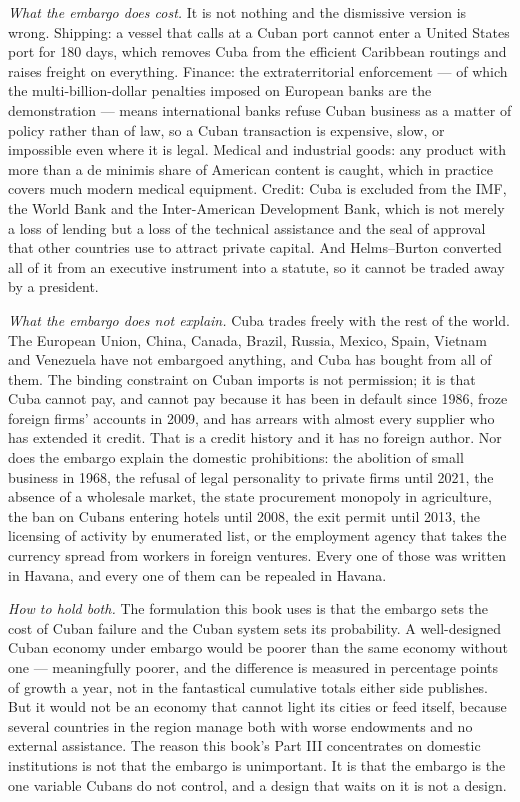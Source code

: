 \emph{What the embargo does cost.} It is not nothing and the dismissive version
is wrong. Shipping: a vessel that calls at a Cuban port cannot enter a United
States port for 180 days, which removes Cuba from the efficient Caribbean
routings and raises freight on everything. Finance: the extraterritorial
enforcement --- of which the multi-billion-dollar penalties imposed on
European banks are the demonstration --- means international banks refuse Cuban
business as a matter of policy rather than of law, so a Cuban transaction is
expensive, slow, or impossible even where it is legal. Medical and industrial
goods: any product with more than a de minimis share of American content is
caught, which in practice covers much modern medical equipment. Credit: Cuba is
excluded from the IMF, the World Bank and the Inter-American Development Bank,
which is not merely a loss of lending but a loss of the technical assistance and
the seal of approval that other countries use to attract private capital. And
Helms--Burton converted all of it from an executive instrument into a statute,
so it cannot be traded away by a president.

\emph{What the embargo does not explain.} Cuba trades freely with the rest of
the world. The European Union, China, Canada, Brazil, Russia, Mexico, Spain,
Vietnam and Venezuela have not embargoed anything, and Cuba has bought from all
of them. The binding constraint on Cuban imports is not permission; it is that
Cuba cannot pay, and cannot pay because it has been in default since 1986, froze
foreign firms' accounts in 2009, and has arrears with almost every supplier who
has extended it credit. That is a credit history and it has no foreign author.
Nor does the embargo explain the domestic prohibitions: the abolition of small
business in 1968, the refusal of legal personality to private firms until 2021,
the absence of a wholesale market, the state procurement monopoly in
agriculture, the ban on Cubans entering hotels until 2008, the exit permit until
2013, the licensing of activity by enumerated list, or the employment agency
that takes the currency spread from workers in foreign ventures. Every one of
those was written in Havana, and every one of them can be repealed in Havana.

\emph{How to hold both.} The formulation this book uses is that the embargo
sets the cost of Cuban failure and the Cuban system sets its probability. A
well-designed Cuban economy under embargo would be poorer than the same economy
without one --- meaningfully poorer, and the difference is measured in
percentage points of growth a year, not in the fantastical cumulative totals
either side publishes. But it would not be an economy that cannot light its
cities or feed itself, because several countries in the region manage both with
worse endowments and no external assistance. The reason this book's Part III
concentrates on domestic institutions is not that the embargo is unimportant.
It is that the embargo is the one variable Cubans do not control, and a design
that waits on it is not a design.

